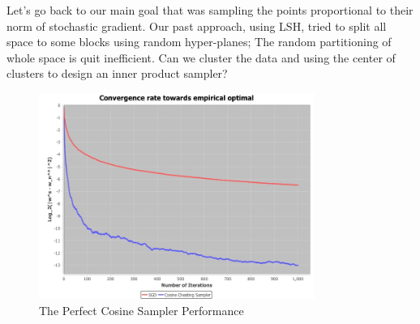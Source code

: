 \documentclass[11pt, a4paper, reqno, twoside]{scrartcl}
\theoremstyle{style}
\newcommand{\0}{\mathbf{0}} %
\begin{document}
Let's go back to our main goal that was sampling the points proportional to
their norm of stochastic gradient. Our past approach, using LSH, tried to
split all space to some blocks using random hyper-planes; The random
partitioning of whole space is quit inefficient. Can we cluster the data and using
the center of clusters to design an inner product sampler? 
 \begin{figure}
    \centering
        \includegraphics[width=0.8\textwidth]{empirical_importance_cosine.JPEG}
    \caption{The Perfect Cosine Sampler
    Performance}\label{fig:convergence_cosine_sampler}
 \end{figure}




\end{document}
